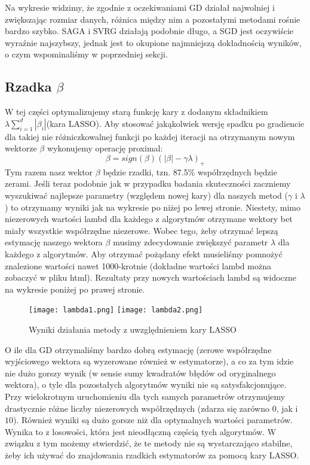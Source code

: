 \documentclass[a4paper]{article}
\begin{document}
Na wykresie widzimy, że zgodnie z oczekiwaniami GD działał najwolniej i zwiększając rozmiar danych, różnica między nim a pozostałymi metodami rośnie bardzo szybko. SAGA i SVRG działają podobnie długo, a SGD jest oczywiście wyraźnie najszybszy, jednak jest to okupione najmniejszą dokładnością wyników, o czym wspominaliśmy w poprzedniej sekcji.

\subsection{Rzadka $\beta$}
W tej części optymalizujemy starą funkcję kary z dodanym składnikiem $\lambda \sum_{i=1}^d |\beta_i|$(kara LASSO). Aby stosować jakąkolwiek wersję spadku po gradiencie dla takiej nie różniczkowalnej funkcji po każdej iteracji na otrzymanym nowym wektorze $\beta$ wykonujemy operację proximal:
$$
	\beta = sign(\beta)(|\beta| - \gamma \lambda)_+
$$
Tym razem nasz wektor $\beta$ będzie rzadki, tzn. 87.5\% współrzędnych będzie zerami. Jeśli teraz podobnie jak w przypadku badania skuteczności zaczniemy wyszukiwać najlepsze parametry (względem nowej kary) dla naszych metod ($\gamma$ i $\lambda$) to otrzymamy wyniki jak na wykresie po niżej po lewej stronie. Niestety, mimo niezerowych wartości lambd dla każdego z algorytmów otrzymane wektory bet miały wszystkie współrzędne niezerowe. Wobec tego, żeby otrzymać lepszą estymację naszego wektora $\beta$ musimy zdecydowanie zwiększyć parametr $\lambda$ dla każdego z algorytmów. Aby otrzymać pożądany efekt musieliśmy pomnożyć znalezione wartości nawet 1000-krotnie (dokładne wartości lambd można zobaczyć w pliku html). Rezultaty przy nowych wartościach lambd są widoczne na wykresie poniżej po prawej stronie. 

\begin{figure}[H]
\caption{Wyniki działania metody z uwzględnieniem kary LASSO}
  \texttt{[image: lambda1.png]}
\endminipage \hfill 
{}
  \texttt{[image: lambda2.png]}
\endminipage \hfill 
\end{figure}

O ile dla GD otrzymaliśmy bardzo dobrą estymację (zerowe współrzędne wyjściowego wektora są wyzerowane również w estymatorze), a co za tym idzie nie dużo gorszy wynik (w sensie sumy kwadratów błędów od oryginalnego wektora), o tyle dla pozostałych algorytmów wyniki nie są satysfakcjonujące. Przy wielokrotnym uruchomieniu dla tych samych parametrów otrzymujemy drastycznie różne liczby niezerowych współrzędnych (zdarza się zarówno $0$, jak i $10$). Również wyniki są dużo gorsze niż dla optymalnych wartości parametrów. Wynika to z losowości, która jest nieodłączną częścią tych algorytmów. W związku z tym możemy stwierdzić, że te metody nie są wystarczająco stabilne, żeby ich używać do znajdowania rzadkich estymatorów za pomocą kary LASSO. 
\end{document}
